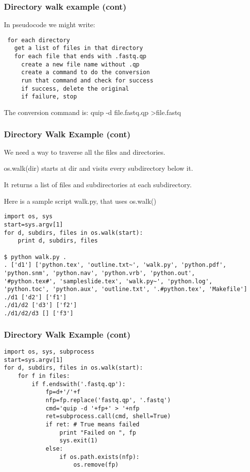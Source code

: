 \documentclass[10pt]{beamer}
\newcommand\smallfont{\fontsize{8pt}{7.2}\selectfont}
\begin{document}
\begin{frame}[fragile]
\frametitle{Directory walk example (cont)}
\smallfont
In pseudocode we might write:
\begin{verbatim}
 for each directory
   get a list of files in that directory
   for each file that ends with .fastq.qp
     create a new file name without .qp
     create a command to do the conversion
     run that command and check for success
     if success, delete the original
     if failure, stop
\end{verbatim}

The conversion command is: quip -d file.fastq.qp \textgreater file.fastq 

\end{frame}

\begin{frame}[fragile]
\frametitle{Directory Walk Example (cont)}

We need a way to traverse all the files and directories.
\vspace{2mm}

os.walk(dir) starts at dir and visits every subdirectory below it.
\vspace{2mm}

It returns a list of files and subdirectories at each subdirectory. 
\vspace{2mm}

Here is a sample script walk.py, that uses os.walk()

\smallfont
\begin{verbatim}
import os, sys
start=sys.argv[1]
for d, subdirs, files in os.walk(start):
    print d, subdirs, files

$ python walk.py .
. ['d1'] ['python.tex', 'outline.txt~', 'walk.py', 'python.pdf', 'python.snm', 'python.nav', 'python.vrb', 'python.out', '#python.tex#', 'sampleslide.tex', 'walk.py~', 'python.log', 'python.toc', 'python.aux', 'outline.txt', '.#python.tex', 'Makefile']
./d1 ['d2'] ['f1']
./d1/d2 ['d3'] ['f2']
./d1/d2/d3 [] ['f3']

\end{verbatim}
\end{frame}

\begin{frame}[fragile]
\frametitle{Directory Walk Example (cont)}

\begin{verbatim}
import os, sys, subprocess
start=sys.argv[1]
for d, subdirs, files in os.walk(start):
    for f in files:
        if f.endswith('.fastq.qp'):
            fp=d+'/'+f
            nfp=fp.replace('fastq.qp', '.fastq')
            cmd='quip -d '+fp+' > '+nfp
            ret=subprocess.call(cmd, shell=True)
            if ret: # True means failed
                print "Failed on ", fp
                sys.exit(1)
            else:
                if os.path.exists(nfp):
                    os.remove(fp)
\end{verbatim}
\end{frame}
\end{document}
